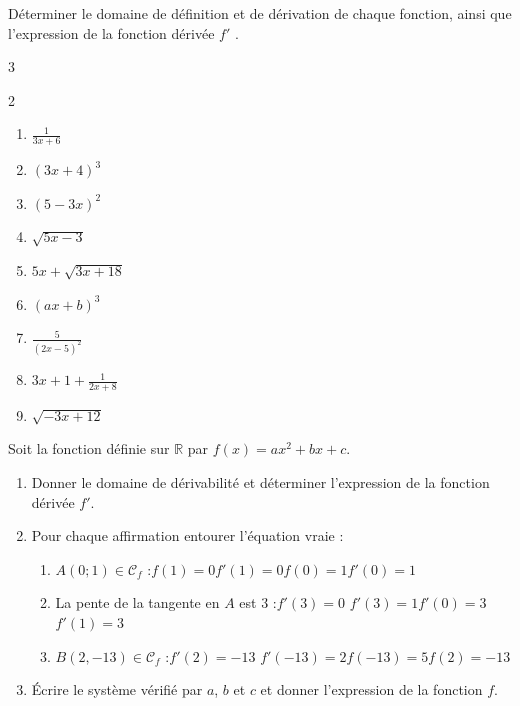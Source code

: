 \documentclass[main.tex]{subfiles}
\begin{document}
\begin{exercise}\label{chapter06:exercice:derivation:operation02} Déterminer le domaine de définition et de dérivation de chaque fonction, ainsi que l'expression de la fonction dérivée $f'$ .
\vspace{-1em}
\begin{multicols}{3}
\begin{spacing}{2} 
	\begin{enumerate}[label={\arabic*)$f(x)=$}, leftmargin=*]
		\item $\frac{1}{3x+6}$ 
		\item $(3x+4)^3$ 
		\item $(5-3x)^2$ 
		\item $\sqrt{5x-3}$ 
		\item $5x+\sqrt{3x+18}$ 
		\item $(ax+b)^3$
		\item $\frac{5}{(2x-5)^2} $
		\item $3x+1+\frac{1}{2x+8}$
		\item $\sqrt{-3x+12}$
	\end{enumerate} 
\end{spacing}
\end{multicols}  
\end{exercise}
 \begin{exercise}\label{chapter04:exercice:determinerfonction01} 
 	Soit la fonction définie sur $\mathbb{R}$ par $f(x)=ax^2+bx +c$.
	\begin{enumerate}[label={\arabic*)}, leftmargin=*]
		\item Donner le domaine de dérivabilité et déterminer l'expression de la fonction dérivée $f'$.
		\item Pour chaque affirmation entourer l'équation vraie :
		\begin{enumerate}[leftmargin=*]
			\item $A(0;1)\in\mathscr{C}_f$ :\hfill $f(1)=0$\hfill $f'(1)=0$\hfill $f(0)=1$\hfill $f'(0)=1$
			\item La pente de la tangente en $A$ est $3$ :\hfill $f'(3)=0$  \hfill$f'(3)=1$\hfill  $f'(0)=3$\hfill$f'(1)=3$
			\item $B(2,-13)\in \mathscr{C}_f$  :\hfill $f'(2)=-13$ \hfill $f'(-13)=2$\hfill $f(-13)=5$\hfill $f(2)=-13$
		\end{enumerate}
		\item Écrire le système vérifié par $a$, $b$ et $c$ et donner l'expression de la fonction $f$.
	\end{enumerate}
\end{exercise} 
\end{document}
